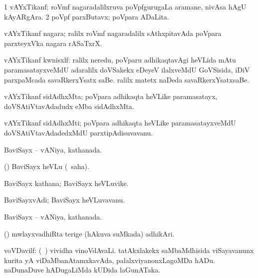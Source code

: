 \bentry
{} 
\gl{\nA}
\expl{}
\bmng
\bnum
\num{1} vAYxTikanf; roVmf nagaradalilxruva poVpfgurugaLa aramane, nivAsa hAgU kAyARgAra. 
\num{2} poVpf parxButavx; poVpara ADaLita. 
\enum
\emng
\eentry

\bentry
{}
\gl{\nA}
\expl{}
\bmng
 vAYxTikanf nagara; ralilx roVmf nagaradalilx sAthxpitavAda poVpara parxteyxVka nagara rASaTxrX. 
\emng
\eentry

\bentry
{}
\gl{\nA}
\expl{}
\bmng
 vAYxTikanf kwnisxlf: 
\banum
{} ralilx neredu, poVparu adhikaqtavAgi heVLida mAtu paramasatayxveMdU adaralilx doVSakekx eDeyeV ilalxveMdU GoVSisida, iDiV parxpaMcada savaRkerxYsatx saBe. 
 ralilx matetx naDeda savaRkerxYsatxsaBe. 
\eanum
\emng
\eentry

\bentry
{} 
\gl{\nA}
\expl{}
\bmng
 vAYxTikanf sidAdhxMta; poVpara adhikaqta heVLike paramasatayx, doVSAtiVtavAdadudx eMba sidAdhxMta. 
\emng
\eentry

\bentry
{} 
\gl{\nA}
\expl{}
\bmng
 vAYxTikanf sidAdhxMti; poVpara adhikaqta heVLike paramasatayxveMdU doVSAtiVtavAdadedxMdU parxtipAdisuvavanu. 
\emng
\eentry

\bentry
{} 
\gl{\gu}
\expl{}
\bmng
 BaviSayx -- vANiya, kathanada. 
\emng
\eentry

\bentry
{} 
\gl{\sakirx}
\expl{}
\bmng
 (\aupa) BaviSayx heVLu (\akirx\ saha). 
\emng
\eentry

\bentry
{} 
\gl{\nA}
\expl{}
\bmng
 BaviSayx kathana; BaviSayx heVLuvike. 
\emng
\eentry

\bentry
{} 
\gl{\nA}
\expl{}
\bmng
 BaviSayxvAdi; BaviSayx heVLuvavanu. 
\emng
\eentry

\bentry
{} 
\gl{\gu}
\expl{}
\bmng
 BaviSayx -- vANiya, kathanada. 
\emng
\eentry

\bentry
{} 
\gl{\nA}
\bmng
 (\AmA) mwlayxvadhiRta terige (hAkuva suMkada) adhikAri. 
\emng
\eentry

\bentry
{} 
\gl{\nA}
\expl{}
\bmng
 voVDavilf: 
\banum
{} (\kanmu\ \ame) vividha vinoVdAvaLi. 
 tatAkxlakekx saMbaMdhisida viSayavanunx kurita yA viDaMbanAtamxkavAda, palalxviyanonxLagoMDa hADu. 
 naDunaDuve hADugaLiMda kUDida laGunATaka. 
\eanum
\emng
\eentry

